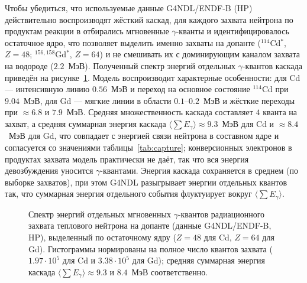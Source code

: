 \documentclass[a4paper,12pt]{extarticle}
\newcommand{\macrocmd}[1]{\texttt{\seqsplit{#1}}}
\begin{document}
Чтобы убедиться, что используемые данные G4NDL/ENDF-B (HP) действительно воспроизводят жёсткий каскад, для каждого захвата нейтрона по продуктам реакции \macrocmd{nCapture} в \macrocmd{SteppingAction} отбирались мгновенные $\gamma$-кванты и идентифицировалось остаточное ядро, что позволяет выделить именно захваты на допанте ($^{114}$Cd$^{*}$, $Z=48$; $^{156,158}$Gd$^{*}$, $Z=64$) и не смешивать их с доминирующим каналом захвата на водороде ($2.2$~МэВ). Полученный спектр энергий отдельных $\gamma$-квантов каскада приведён на рисунке~\ref{fig:capture_gamma}. Модель воспроизводит характерные особенности: для Cd --- интенсивную линию $0.56$~МэВ и переход на основное состояние $^{114}$Cd при $9.04$~МэВ, для Gd --- мягкие линии в области $0.1$--$0.2$~МэВ и жёсткие переходы при $\approx 6.8$ и $7.9$~МэВ. Средняя множественность каскада составляет $4$ кванта на захват, а средняя суммарная энергия каскада $\langle\sum E_\gamma\rangle\approx 9.3$~МэВ для Cd и $\approx 8.4$~МэВ для Gd, что совпадает с энергией связи нейтрона в составном ядре и согласуется со значениями таблицы~\ref{tab:capture}; конверсионных электронов в продуктах захвата модель практически не даёт, так что вся энергия девозбуждения уносится $\gamma$-квантами. Энергия каскада сохраняется в среднем (по выборке захватов), при этом G4NDL разыгрывает энергии отдельных квантов так, что суммарная энергия отдельного события флуктуирует вокруг $\langle\sum E_\gamma\rangle$.

\begin{figure}[h!]
\centering
{}
\caption{Спектр энергий отдельных мгновенных $\gamma$-квантов радиационного захвата теплового нейтрона на допанте (данные G4NDL/ENDF-B, HP), выделенный по остаточному ядру ($Z=48$ для Cd, $Z=64$ для Gd). Гистограммы нормированы на полное число квантов захвата ($1.97\cdot 10^{5}$ для Cd и $3.38\cdot 10^{5}$ для Gd); средняя суммарная энергия каскада $\langle\sum E_\gamma\rangle\approx 9.3$ и $8.4$~МэВ соответственно.}
\label{fig:capture_gamma}
\end{figure}
\end{document}
